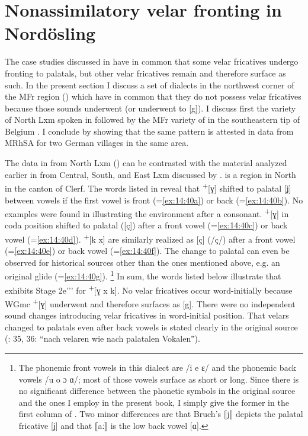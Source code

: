 \section{{Nonassimilatory} {velar} {fronting} {in} {Nordösling}}\label{sec:14.5}

The case studies discussed in  have in common that some velar fricatives undergo fronting to palatals, but other velar fricatives remain and therefore surface as such. In the present section I discuss a set of dialects in the northwest corner of the MFr region () which have in common that they do not possess velar fricatives because those sounds underwent  (or underwent  to [g]). I discuss first the variety of North Lxm spoken in  \citep{Bruch1952} followed by the MFr variety of  in the southeastern tip of Belgium \citep{Hecker1972}. I conclude by showing that the same pattern is attested in data from MRhSA for two German villages in the same area.

The data in  from North Lxm () can be contrasted with the material analyzed earlier in  from Central, South, and East Lxm discussed by \citet{Gilles1999}.  is a region in North  in the canton of Clerf. The words listed in  reveal that  \textsuperscript{+}[ɣ] shifted to palatal [ʝ] between vowels if the first vowel is front (=\ref{ex:14:40a}) or back (=\ref{ex:14:40b}). No examples were found in \citet{Bruch1952} illustrating the environment after a consonant.  \textsuperscript{+}[ɣ] in coda position shifted to palatal ([ç]) after a front vowel (=\ref{ex:14:40c}) or back vowel (=\ref{ex:14:40d}).  \textsuperscript{+}[k x] are similarly realized as [ç] (/ç/) after a front vowel (=\ref{ex:14:40e}) or back vowel (=\ref{ex:14:40f}). The change to palatal can even be observed for historical sources other than the ones mentioned above, e.g. an original glide (=\ref{ex:14:40g}).{} \footnote{{The phonemic front vowels in this dialect are /i e ɛ/ and the phonemic back vowels /u o ɔ ɑ/; most of those vowels surface as short or long.} \textrm{Since there is no significant difference between the phonetic symbols in the original source and the ones I employ in the present book, I simply give the former in the first column of . Two minor differences are that Bruch’s ⟦j⟧ depicts the palatal fricative [ʝ] and that ⟦aː⟧ is the low back vowel [ɑ].} }  In sum, the words listed below illustrate that  exhibits Stage 2e'{}'{}' for  \textsuperscript{+}[ɣ x k]. No velar fricatives occur word-initially because WGmc \textsuperscript{+}[ɣ] underwent  and therefore surfaces as [g].  There were no independent sound changes introducing velar fricatives in word-initial position. That velars changed to palatals even after back vowels is stated clearly in the original source (\citealt{Bruch1952}: 35, 36: “nach velaren wie nach palatalen Vokalenˮ).


